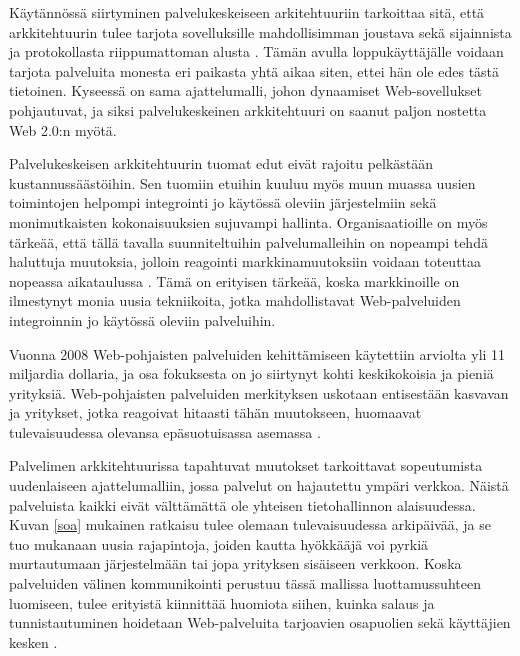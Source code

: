Käytännössä siirtyminen palvelukeskeiseen arkitehtuuriin tarkoittaa sitä, että arkkitehtuurin
tulee tarjota sovelluksille mahdollisimman joustava sekä sijainnista ja
protokollasta riippumattoman alusta \cite{SOA}. Tämän avulla loppukäyttäjälle
voidaan tarjota palveluita monesta eri paikasta yhtä aikaa siten, ettei hän ole
edes tästä tietoinen. Kyseessä on sama ajattelumalli, johon dynaamiset Web-sovellukset
pohjautuvat, ja siksi palvelukeskeinen arkkitehtuuri on saanut paljon
nostetta Web 2.0:n myötä.

Palvelukeskeisen arkkitehtuurin tuomat edut eivät rajoitu pelkästään
kustannussäästöihin. Sen tuomiin etuihin kuuluu myös muun muassa uu\-si\-en toimintojen
helpompi integrointi jo käytössä oleviin järjestelmiin sekä monimutkaisten
kokonaisuuksien sujuvampi hallinta. Organisaatioille on myös tärkeää, että tällä
tavalla suunniteltuihin palvelumalleihin on nopeampi tehdä haluttuja muutoksia, jolloin 
reagointi markkinamuutoksiin voidaan toteuttaa nopeassa aikataulussa \cite{WEB2c}. Tämä on
erityisen tärkeää, koska markkinoille on ilmestynyt monia uusia tekniikoita,
jotka mahdollistavat Web-palveluiden integroinnin jo käytössä oleviin
palveluihin.

Vuonna 2008 Web-pohjaisten palveluiden kehittämiseen
käytettiin arviolta yli 11 miljardia dollaria, ja osa fokuksesta on jo siirtynyt
kohti keskikokoisia ja pieniä yrityksiä. Web-pohjaisten palveluiden merkityksen
uskotaan entisestään kasvavan ja yritykset, jotka reagoivat hitaasti tähän
muutokseen, huomaavat tulevaisuudessa olevansa epäsuotuisassa asemassa \cite{WEB2b}.

Palvelimen arkkitehtuurissa tapahtuvat muutokset tarkoittavat sopeutumista uudenlaiseen
ajattelumalliin, jossa palvelut on hajautettu ympäri verkkoa. Näistä palveluista kaikki
eivät välttämättä ole yhteisen tietohallinnon alaisuudessa. Kuvan \ref{soa} mukainen ratkaisu
tulee olemaan tulevaisuudessa arkipäivää, ja se tuo mukanaan uusia rajapintoja,
joiden kautta hyökkääjä voi pyrkiä murtautumaan järjestelmään tai jopa
yrityksen sisäiseen verkkoon. Koska palveluiden välinen kommunikointi perustuu
tässä mallissa luottamussuhteen luomiseen, tulee erityistä kiinnittää huomiota
siihen, kuinka salaus ja tunnistautuminen hoidetaan Web-palveluita tarjoavien
osapuolien sekä käyttäjien kesken \cite{WEB2b}.

